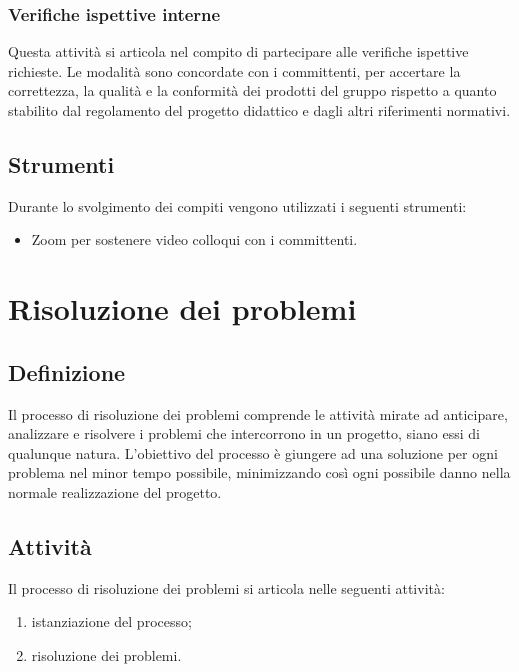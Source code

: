 \subsubsection{Verifiche ispettive interne}
Questa attività si articola nel compito di partecipare alle verifiche ispettive richieste. Le modalità sono concordate con i committenti, per accertare la correttezza, la qualità e la conformità dei prodotti del gruppo rispetto a quanto stabilito dal regolamento del progetto didattico e dagli altri riferimenti normativi.
\subsection{Strumenti}
Durante lo svolgimento dei compiti vengono utilizzati i seguenti strumenti:
\begin{itemize}
    \item Zoom per sostenere video colloqui con i committenti.
\end{itemize}
\newpage

\section{Risoluzione dei problemi} \label{sec:risoprob}
\subsection{Definizione}
Il processo di risoluzione dei problemi comprende le attività mirate ad anticipare, analizzare e risolvere i problemi che intercorrono in un progetto, siano essi di qualunque natura. L'obiettivo del processo è giungere ad una soluzione per ogni problema nel minor tempo possibile, minimizzando così ogni possibile danno nella normale realizzazione del progetto.
\subsection{Attività}
Il processo di risoluzione dei problemi si articola nelle seguenti attività:
\begin{enumerate}
    \item istanziazione del processo;
    \item risoluzione dei problemi.
\end{enumerate}
